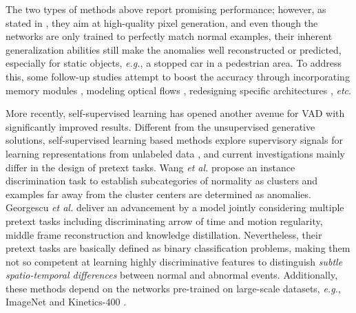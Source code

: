 \documentclass[runningheads]{llncs}
\begin{document}
The two types of methods above report promising performance; however, as stated in \cite{gong2019memorizing, munawar2017limiting, zong2018deep}, they aim at high-quality pixel generation, and even though the networks are only trained to perfectly match normal examples, their inherent generalization abilities still make the anomalies well reconstructed or predicted, especially for static objects, \emph{e.g.}, a stopped car in a pedestrian area. To address this, some follow-up studies attempt to boost the accuracy through incorporating memory modules \cite{gong2019memorizing, park2020learning}, modeling optical flows \cite{liu2018future}, redesigning specific architectures \cite{feng2021Conv}, \emph{etc}. 


More recently, self-supervised learning has opened another avenue for VAD with significantly improved results. Different from the unsupervised generative solutions, self-supervised learning based methods explore supervisory signals for learning representations from unlabeled data \cite{wang2020cluster, georgescu2021anomaly}, and current investigations mainly differ in the design of pretext tasks. Wang \emph{et al.} \cite{wang2020cluster} propose an instance discrimination task to establish subcategories of normality as clusters and examples far away from the cluster centers are determined as anomalies. Georgescu \emph{et al.} \cite{georgescu2021anomaly} deliver an advancement by a model jointly considering multiple pretext tasks including discriminating arrow of time and motion regularity, middle frame reconstruction and knowledge distillation. Nevertheless, their pretext tasks are basically defined as binary classification problems, making them not so competent at learning highly discriminative features to distinguish \emph{subtle spatio-temporal differences} between normal and abnormal events. Additionally, these methods \cite{georgescu2021anomaly, wang2020cluster} depend on the networks pre-trained on large-scale datasets, \emph{e.g.}, ImageNet \cite{russakovsky2015imagenet} and Kinetics-400 \cite{kay2017kinetics}. 
\end{document}
